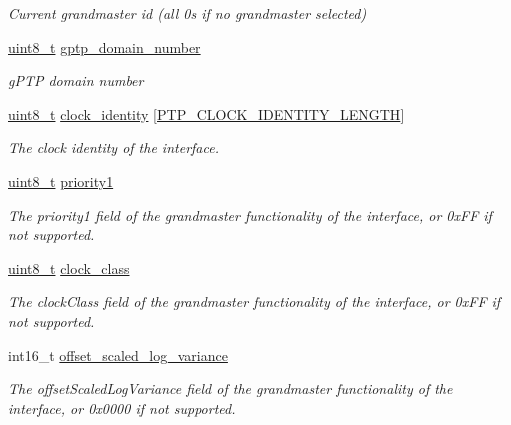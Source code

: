 \begin{DoxyCompactItemize}
\begin{DoxyCompactList}\small\item\em Current grandmaster id (all 0\textquotesingle{}s if no grandmaster selected) \end{DoxyCompactList}\item 
\hyperlink{stdint_8h_aba7bc1797add20fe3efdf37ced1182c5}{uint8\+\_\+t} \hyperlink{class_offset_ac53b4e61c0f960e16c86cfe678ca256d}{gptp\+\_\+domain\+\_\+number}
\begin{DoxyCompactList}\small\item\em g\+P\+TP domain number \end{DoxyCompactList}\item 
\hyperlink{stdint_8h_aba7bc1797add20fe3efdf37ced1182c5}{uint8\+\_\+t} \hyperlink{class_offset_a9efbd85d909d77f7fd70f9f8391c49fa}{clock\+\_\+identity} \mbox{[}\hyperlink{windows__ipc_8hpp_afd1566058ed7927c2b790c9d4a0051ec}{P\+T\+P\+\_\+\+C\+L\+O\+C\+K\+\_\+\+I\+D\+E\+N\+T\+I\+T\+Y\+\_\+\+L\+E\+N\+G\+TH}\mbox{]}
\begin{DoxyCompactList}\small\item\em The clock identity of the interface. \end{DoxyCompactList}\item 
\hyperlink{stdint_8h_aba7bc1797add20fe3efdf37ced1182c5}{uint8\+\_\+t} \hyperlink{class_offset_af98f08e3d1b016cd549310197ba8673c}{priority1}
\begin{DoxyCompactList}\small\item\em The priority1 field of the grandmaster functionality of the interface, or 0x\+FF if not supported. \end{DoxyCompactList}\item 
\hyperlink{stdint_8h_aba7bc1797add20fe3efdf37ced1182c5}{uint8\+\_\+t} \hyperlink{class_offset_aafe98ca785cdce0ce5eaa26f2930d2fe}{clock\+\_\+class}
\begin{DoxyCompactList}\small\item\em The clock\+Class field of the grandmaster functionality of the interface, or 0x\+FF if not supported. \end{DoxyCompactList}\item 
int16\+\_\+t \hyperlink{class_offset_a022841cfc4d83dc906f116eec53f1d9a}{offset\+\_\+scaled\+\_\+log\+\_\+variance}
\begin{DoxyCompactList}\small\item\em The offset\+Scaled\+Log\+Variance field of the grandmaster functionality of the interface, or 0x0000 if not supported. \end{DoxyCompactList}\item 

\end{DoxyCompactItemize}
